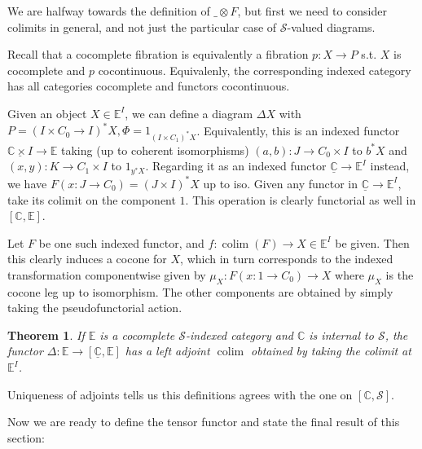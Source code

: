 \documentclass[10pt, oneside]{article}
\newtheorem{theorem}{Theorem}[section]
\begin{document}
We are halfway towards the definition of $\_ \otimes F$, but first we need to consider colimits in general, and not just the particular case of $\mathcal{S}$-valued diagrams.

Recall that a cocomplete fibration is equivalently a fibration $p: X \to P$ s.t. $X$ is cocomplete and $p$ cocontinuous. Equivalenly, the corresponding indexed category has all categories cocomplete and functors cocontinuous.

Given an object $X \in \mathbb{E}^I$, we can define a diagram $\Delta X$ with $P = (I \times C_0 \to I)^\ast X, \Phi = 1_{(I \times C_1)^\ast X}$. Equivalently, this is an indexed functor $\underline{\mathbb{C} \times I} \to \mathbb{E}$ taking (up to coherent isomorphisms) $(a,  b): J \to C_0 \times I$ to $b^\ast X$ and $(x, y): K \to C_1 \times I$ to $1_{y^\ast X}$. Regarding it as an indexed functor $\underline{\mathbb{C}} \to \mathbb{E}^I$ instead, we have $F(x: J \to C_0) = (J \times I)^\ast X$ up to iso. Given any functor in $\underline{\mathbb{C}} \to \mathbb{E}^I$, take its colimit on the component $1$. This operation is clearly functorial as well in $[\mathbb{C}, \mathbb{E}]$.

Let $F$ be one such indexed functor, and $f: \operatorname{colim}(F) \to X \in \mathbb{E}^I$ be given. Then this clearly induces a cocone for $X$, which in turn corresponds to the indexed transformation componentwise given by $\mu_X: F(x: 1 \to C_0) \to X$ where $\mu_X$ is the cocone leg up to isomorphism. The other components are obtained by simply taking the pseudofunctorial action.

\begin{theorem}
    If $\mathbb{E}$ is a cocomplete $\mathcal{S}$-indexed category and $\mathbb{C}$ is internal to $\mathcal{S}$, the functor $\Delta: \mathbb{E} \to [\underline{\mathbb{C}}, \mathbb{E}]$ has a left adjoint $\operatorname{colim}$ obtained by taking the colimit at $\mathbb{E}^I$.
\end{theorem}

Uniqueness of adjoints tells us this definitions agrees with the one on $[\mathbb{C}, \mathcal{S}]$.

Now we are ready to define the tensor functor and state the final result of this section:
\end{document}
